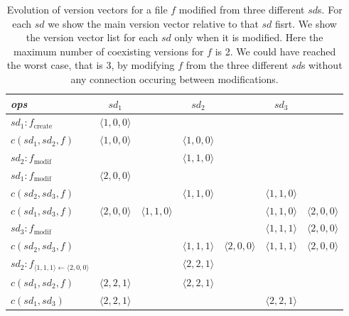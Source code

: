 \begin{table*}[t]
\begin{center}
  \begin{tabular}[t]{|l||cc|cc|cc|}
    \hline
    \emph{ops} & $sd_{1}$ & & $sd_{2}$ & & $sd_{3}$ & \\
    \hline

    $sd_{1} : f_{\text{create}}$ & 
    $\langle 1,0,0\rangle$ & &
     & &
     & \\

    $c(sd_{1},sd_{2},f)$ &
    $\langle 1,0,0 \rangle$ & &
    $\langle 1,0,0 \rangle$ & &
     & \\

    $sd_{2} : f_{\text{modif}}$ & 
    & &
    $\langle 1,1,0 \rangle$ & &
     & \\

    $sd_{1} : f_{\text{modif}}$ &
    $\langle 2,0,0 \rangle$ & &
    & &
     & \\

    $c(sd_{2},sd_{3},f)$ &
    & & 
    $\langle 1,1,0 \rangle$ & &
    $\langle 1,1,0 \rangle$ & \\

    $c(sd_{1},sd_{3},f)$ &
    $\langle 2,0,0 \rangle$ & $\langle 1,1,0 \rangle$ &
    & &
    $\langle 1,1,0 \rangle$ & $\langle 2,0,0 \rangle$ \\

    $sd_{3} : f_{\text{modif}}$ &
    & &
    & & 
    $\langle 1,1,1 \rangle$ & $\langle 2,0,0 \rangle$ \\

    $c(sd_{2},sd_{3},f)$ &
    & &
    $\langle 1,1,1 \rangle$ & $\langle 2,0,0 \rangle$ & 
    $\langle 1,1,1 \rangle$ & $\langle 2,0,0 \rangle$ \\

    $sd_{2} : f_{\langle 1,1,1 \rangle \leftarrow \langle 2,0,0 \rangle}$ &
    & &
    $\langle 2,2,1 \rangle$ & &
    & \\

    $c(sd_{1},sd_{2},f)$ &
    $\langle 2,2,1 \rangle$ & &
    $\langle 2,2,1 \rangle$ & & 
    & \\

    $c(sd_{1},sd_{3})$ &
    $\langle 2,2,1 \rangle$ & &
    & &
    $\langle 2,2,1 \rangle$ & \\

    \hline
  \end{tabular}
\end{center}
\caption{\label{VVEx}
  {\small Evolution of version vectors for a file $f$ modified from
  three different $sd$s. For each $sd$ we show the main version
  vector relative to that $sd$ fisrt. We show the version vector list
  for each $sd$ only when it is modified.
  Here the maximum number of
  coexisting versions for $f$ is 2. We could have reached the worst
  case, that is 3, by modifying $f$ from the three different $sd$s
  without any connection occuring between modifications.}}
\end{table*}

